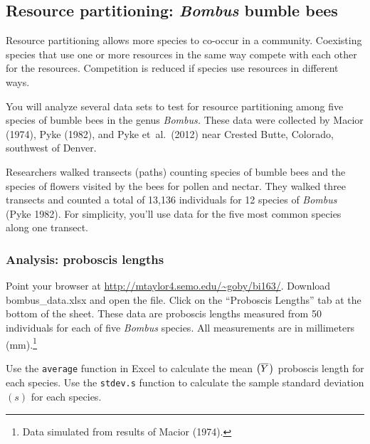 \documentclass[12pt, hidelinks]{exam}
\newcommand*\meanY{\overline{Y}\kern0.67pt}
\begin{document}
\subsection*{Resource partitioning: \textit{Bombus} bumble bees}

Resource partitioning allows more species to co-occur in a community.
Coexisting species that use one or more resources in the same way compete
with each other for the resources. Competition is reduced if species
use resources in different ways.



You will analyze several data sets to test for resource partitioning among five
species of bumble bees in the genus \textit{Bombus.} These data were collected
by Macior (1974), Pyke (1982), and Pyke et~al.~(2012) near Crested Butte, Colorado,
southwest of Denver.

Researchers walked transects (paths) counting species of bumble bees and the 
species of flowers visited by the bees for pollen and nectar. They walked
three transects and counted a total of 13,136 individuals for 12 species of 
\textit{Bombus} (Pyke 1982). For simplicity, you'll use data for the five most common 
species along one transect.


\subsubsection*{Analysis: proboscis lengths}

Point your browser at \url{http://mtaylor4.semo.edu/~goby/bi163/}. Download bombus\_data.xlsx and open the file. Click on the “Proboscis Lengths” tab at the bottom of the sheet. These data are
 proboscis lengths measured from 50 individuals for each of five \textit{Bombus} species. All measurements are in millimeters (mm).\footnote{Data simulated 
from results of Macior (1974).}

Use the \texttt{average} function in Excel to calculate the mean $\left(\meanY\right)$ proboscis length for each species. Use the \texttt{stdev.s} function
to calculate the sample standard deviation $\left(s\right)$ for each species. %
%
%
\end{document}
